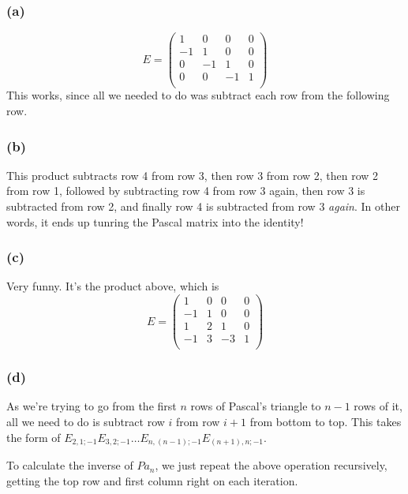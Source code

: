 \documentclass{article}
\begin{document}
\subsubsection{(a)}
\[
E=\left( 
\begin{array}{cccc}
1 &0 &0 &0\\
-1&1 &0 &0\\
0 &-1&1 &0\\
0 &0 &-1&1\\
\end{array}
\right)
\]
This works, since all we needed to do was subtract each row from the following
row.
\subsubsection{(b)}
This product subtracts row 4 from row 3, then row 3 from row 2, then row 2 from
row 1, followed by subtracting row 4 from row 3 again, then row 3 is subtracted
from row 2, and finally row 4 is subtracted from row 3 \emph{again}.
In other words, it ends up tunring the Pascal matrix into the identity!
\subsubsection{(c)}
Very funny. It's the product above, which is 
\[
E=\left( 
\begin{array}{cccc}
1 &0 &0 &0\\
-1&1 &0 &0\\
1 &2 &1 &0\\
-1&3 &-3&1\\
\end{array}
\right)
\]

\subsubsection{(d)}
As we're trying to go from the first $n$ rows of Pascal's triangle to $n-1$ rows
of it, all we need to do is subtract row $i$ from row $i+1$ from bottom to top.
This takes the form of
$E_{2,1;-1}E_{3,2;-1}\dots E_{n,(n-1); -1}E_{(n+1),n; -1}$.

\medskip
To calculate the inverse of $Pa_n$, we just repeat the above operation
recursively, getting the top row and first column right on each iteration.
\end{document}
